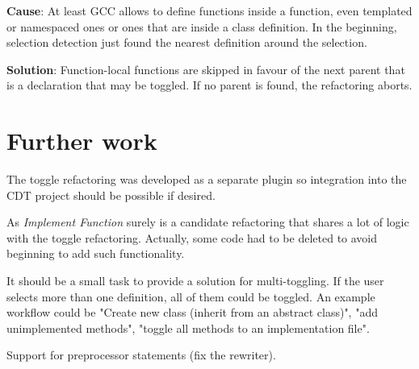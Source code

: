 \textbf{Cause}: At least GCC allows to define functions inside a function, even 
templated or namespaced ones or ones that are inside a class definition. In the 
beginning, selection detection just found the nearest definition around the 
selection.

\textbf{Solution}: Function-local functions are skipped in favour of the next 
parent that is a declaration that may be toggled. If no parent is found, the 
refactoring aborts.


\section{Further work}

The toggle refactoring was developed as a separate plugin so integration into 
the CDT project should be possible if desired.

As \textit{Implement Function} surely is a candidate refactoring that shares a 
lot of logic with the toggle refactoring. Actually, some code had to be deleted 
to avoid beginning to add such functionality.

It should be a small task to provide a solution for multi-toggling. If the user 
selects more than one definition, all of them could be toggled. An example 
workflow could be "Create new class (inherit from an abstract class)", "add 
unimplemented methods", "toggle all methods to an implementation file".

Support for preprocessor statements (fix the rewriter).


